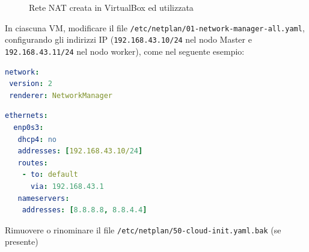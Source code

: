 \documentclass[11pt, a4paper]{article}
\begin{document}

\begin{figure}[H]
\centering
\caption{Rete NAT creata in VirtualBox ed utilizzata}
\end{figure}

In ciascuna VM, modificare il file \texttt{/etc/netplan/01-network-manager-all.yaml}, configurando gli indirizzi IP (\texttt{192.168.43.10/24} nel nodo Master e \texttt{192.168.43.11/24} nel nodo worker), come nel seguente esempio:

\begin{lstlisting}[language=yaml]
network:
 version: 2
 renderer: NetworkManager
\end{lstlisting}


\begin{lstlisting}[language=yaml]
 ethernets:
  enp0s3:
   dhcp4: no
   addresses: [192.168.43.10/24]
   routes:
    - to: default
      via: 192.168.43.1
   nameservers:
    addresses: [8.8.8.8, 8.8.4.4]
\end{lstlisting}

Rimuovere o rinominare il file \texttt{/etc/netplan/50-cloud-init.yaml.bak} (se presente)
\end{document}
